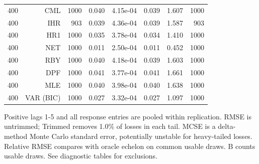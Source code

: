 \begin{table}[p]
\begin{tabular}{rrrrrrrr}
400 & CML & 1000 & 0.040 & 4.15e-04 & 0.039 & 1.607 & 1000 \\
400 & IHR &  903 & 0.039 & 4.36e-04 & 0.039 & 1.587 &  903 \\
400 & HR1 & 1000 & 0.035 & 3.78e-04 & 0.034 & 1.410 & 1000 \\
400 & NET & 1000 & 0.011 & 2.50e-04 & 0.011 & 0.452 & 1000 \\
400 & RBY & 1000 & 0.040 & 4.18e-04 & 0.039 & 1.603 & 1000 \\
400 & DPF & 1000 & 0.041 & 3.77e-04 & 0.041 & 1.661 & 1000 \\
400 & MLE & 1000 & 0.040 & 3.98e-04 & 0.040 & 1.638 & 1000 \\
400 & VAR (BIC) & 1000 & 0.027 & 3.32e-04 & 0.027 & 1.097 & 1000 \\
\bottomrule\end{tabular}
\par\medskip
\begin{minipage}{0.98\linewidth}\footnotesize Positive lags 1-5 and all response entries are pooled within replication. RMSE is untrimmed; Trimmed removes 1.0\% of losses in each tail. MCSE is a delta-method Monte Carlo standard error, potentially unstable for heavy-tailed losses. Relative RMSE compares with oracle echelon on common usable draws. B counts usable draws. See diagnostic tables for exclusions.\end{minipage}
\end{table}
